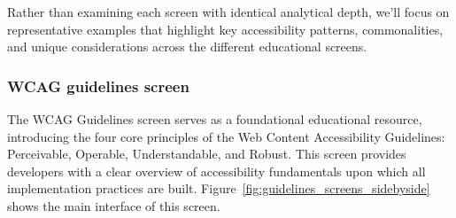 Rather than examining each screen with identical analytical depth, we'll focus on representative examples that highlight key accessibility patterns, commonalities, and unique considerations across the different educational screens.

\subsubsection{WCAG guidelines screen}
\label{subsubsec:guidelines-screen}

The WCAG Guidelines screen serves as a foundational educational resource, introducing the four core principles of the Web Content Accessibility Guidelines: Perceivable, Operable, Understandable, and Robust. This screen provides developers with a clear overview of accessibility fundamentals upon which all implementation practices are built. Figure~\ref{fig:guidelines_screens_sidebyside} shows the main interface of this screen.

\pagebreak

